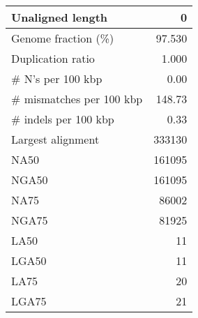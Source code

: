 \documentclass[12pt,a4paper]{article}
\begin{document}
\begin{table}[ht]
\begin{center}
\begin{tabular}{|l*{1}{|r}|}
Unaligned length & 0 \\ \hline
Genome fraction (\%) & 97.530 \\ \hline
Duplication ratio & 1.000 \\ \hline
\# N's per 100 kbp & 0.00 \\ \hline
\# mismatches per 100 kbp & 148.73 \\ \hline
\# indels per 100 kbp & 0.33 \\ \hline
Largest alignment & 333130 \\ \hline
NA50 & 161095 \\ \hline
NGA50 & 161095 \\ \hline
NA75 & 86002 \\ \hline
NGA75 & 81925 \\ \hline
LA50 & 11 \\ \hline
LGA50 & 11 \\ \hline
LA75 & 20 \\ \hline
LGA75 & 21 \\ \hline
\end{tabular}
\end{center}
\end{table}
\end{document}
